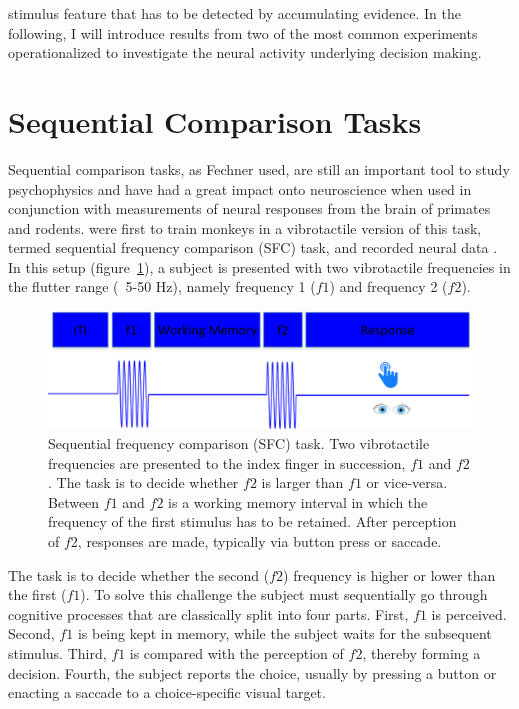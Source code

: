 stimulus feature that has to be detected by accumulating evidence. In the following, I will introduce results from two of the most common experiments operationalized to investigate the neural activity underlying decision making. 

\section{Sequential Comparison Tasks}
Sequential comparison tasks, as Fechner used, are still an important tool to study psychophysics and have had a great impact onto neuroscience when used in conjunction with measurements of neural responses from the brain of primates and rodents. \textcite{Mountcastle1969} were first to train monkeys in a vibrotactile version of this task, termed sequential frequency comparison (SFC) task, and recorded neural data \parencite{Mountcastle1967,Mountcastle1990}.
In this setup (figure~\ref{fig:SFCtask}), a subject is presented with two vibrotactile frequencies in the flutter range (~5-50 Hz), namely frequency 1 ($f1$) and frequency 2 ($f2$).
\begin{figure}[t]
\centering
\includegraphics[width=1\textwidth]{figures/SFC_task.png}
\caption{Sequential frequency comparison (SFC) task. Two vibrotactile frequencies are presented to the index finger in succession, $f1$ and $f2$. The task is to decide whether $f2$ is larger than $f1$ or vice-versa. Between $f1$ and $f2$ is a working memory interval in which the frequency of the first stimulus has to be retained. After perception of $f2$, responses are made, typically via button press or saccade.}
\label{fig:SFCtask}
\end{figure}
The task is to decide whether the second ($f2$) frequency is higher or lower than the first ($f1$). To solve this challenge the subject must sequentially go through cognitive processes that are classically split into four parts. First, $f1$ is perceived. Second, $f1$ is being kept in memory, while the subject waits for the subsequent stimulus. Third, $f1$ is compared with the perception of $f2$, thereby forming a decision.  Fourth, the subject reports the choice, usually by pressing a button or enacting a saccade to a choice-specific visual target.
